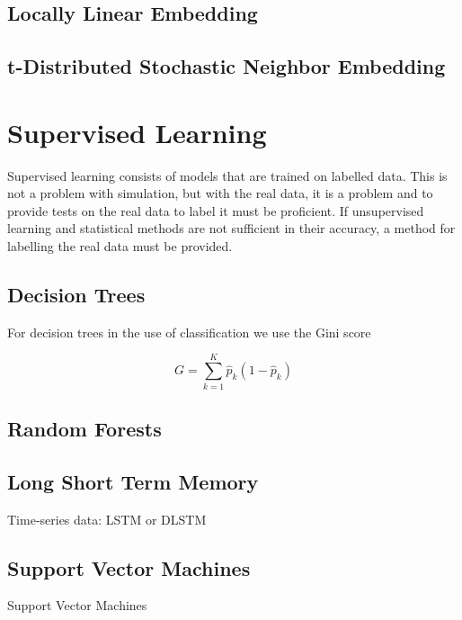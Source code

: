 \subsection{Locally Linear Embedding}
\subsection{t-Distributed Stochastic Neighbor Embedding}


\section{Supervised Learning}
Supervised learning consists of models that are trained on labelled data. This is not a problem with simulation, but with the real data, it is a problem and to provide tests on the real data to label it must be proficient. If unsupervised learning and statistical methods are not sufficient in their accuracy, a method for labelling the real data must be provided.

\subsection{Decision Trees}
For decision trees in the use of classification we use the Gini score

\begin{equation}
	G = \sum_{k=1}^{K} \hat{p}_{k} (1-\hat{p}_{k})
\end{equation}

\subsection{Random Forests}
\cite{Shi2006, Paul2018, Primartha2018}

\subsection{Long Short Term Memory}
Time-series data: LSTM or DLSTM

\subsection{Support Vector Machines}
Support Vector Machines

